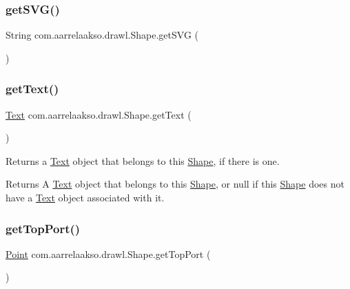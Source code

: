 \subsubsection{\texorpdfstring{get\+S\+V\+G()}{getSVG()}}
{\footnotesize\ttfamily String com.\+aarrelaakso.\+drawl.\+Shape.\+get\+S\+VG (\begin{DoxyParamCaption}{ }\end{DoxyParamCaption})}

\mbox{\label{classcom_1_1aarrelaakso_1_1drawl_1_1_shape_a6f876978d4102974fedc5b41c93c7b26}} 
\subsubsection{\texorpdfstring{get\+Text()}{getText()}}
{\footnotesize\ttfamily \hyperlink{classcom_1_1aarrelaakso_1_1drawl_1_1_text}{Text} com.\+aarrelaakso.\+drawl.\+Shape.\+get\+Text (\begin{DoxyParamCaption}{ }\end{DoxyParamCaption})}



Returns a \hyperlink{classcom_1_1aarrelaakso_1_1drawl_1_1_text}{Text} object that belongs to this \hyperlink{classcom_1_1aarrelaakso_1_1drawl_1_1_shape}{Shape}, if there is one. 

\begin{DoxyReturn}{Returns}
A \hyperlink{classcom_1_1aarrelaakso_1_1drawl_1_1_text}{Text} object that belongs to this \hyperlink{classcom_1_1aarrelaakso_1_1drawl_1_1_shape}{Shape}, or {\ttfamily null} if this \hyperlink{classcom_1_1aarrelaakso_1_1drawl_1_1_shape}{Shape} does not have a \hyperlink{classcom_1_1aarrelaakso_1_1drawl_1_1_text}{Text} object associated with it. 
\end{DoxyReturn}
\mbox{\label{classcom_1_1aarrelaakso_1_1drawl_1_1_shape_aed4e9caa294aacc973b7a531a960e9e5}} 
\subsubsection{\texorpdfstring{get\+Top\+Port()}{getTopPort()}}
{\footnotesize\ttfamily \hyperlink{classcom_1_1aarrelaakso_1_1drawl_1_1_point}{Point} com.\+aarrelaakso.\+drawl.\+Shape.\+get\+Top\+Port (\begin{DoxyParamCaption}{ }\end{DoxyParamCaption})}



